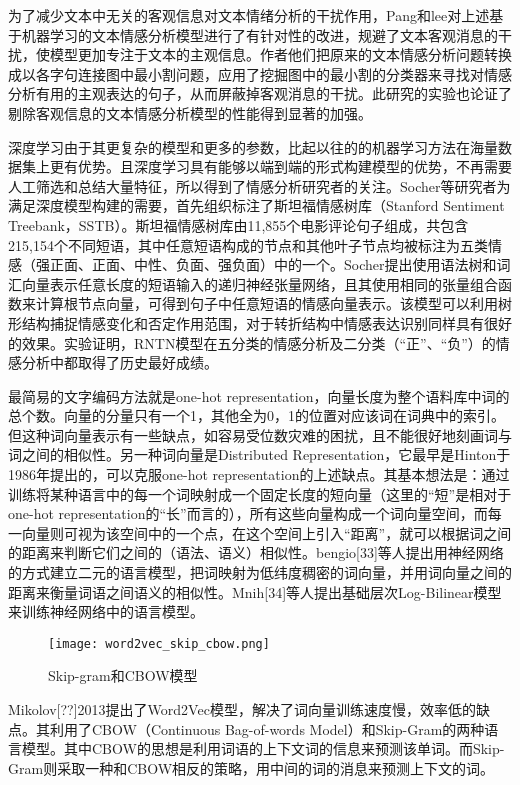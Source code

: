 为了减少文本中无关的客观信息对文本情绪分析的干扰作用，Pang和lee对上述基于机器学习的文本情感分析模型进行了有针对性的改进，规避了文本客观消息的干扰，使模型更加专注于文本的主观信息。作者他们把原来的文本情感分析问题转换成以各字句连接图中最小割问题，应用了挖掘图中的最小割的分类器来寻找对情感分析有用的主观表达的句子，从而屏蔽掉客观消息的干扰。此研究的实验也论证了剔除客观信息的文本情感分析模型的性能得到显著的加强。


深度学习由于其更复杂的模型和更多的参数，比起以往的的机器学习方法在海量数据集上更有优势。且深度学习具有能够以端到端的形式构建模型的优势，不再需要人工筛选和总结大量特征，所以得到了情感分析研究者的关注。Socher等研究者为满足深度模型构建的需要，首先组织标注了斯坦福情感树库（Stanford Sentiment Treebank，SSTB）。斯坦福情感树库由11,855个电影评论句子组成，共包含215,154个不同短语，其中任意短语构成的节点和其他叶子节点均被标注为五类情感（强正面、正面、中性、负面、强负面）中的一个。Socher提出使用语法树和词汇向量表示任意长度的短语输入的递归神经张量网络，且其使用相同的张量组合函数来计算根节点向量，可得到句子中任意短语的情感向量表示。该模型可以利用树形结构捕捉情感变化和否定作用范围，对于转折结构中情感表达识别同样具有很好的效果。实验证明，RNTN模型在五分类的情感分析及二分类（“正”、“负”）的情感分析中都取得了历史最好成绩。

最简易的文字编码方法就是one-hot representation，向量长度为整个语料库中词的总个数。向量的分量只有一个1，其他全为0，1的位置对应该词在词典中的索引。但这种词向量表示有一些缺点，如容易受位数灾难的困扰，且不能很好地刻画词与词之间的相似性。另一种词向量是Distributed Representation，它最早是Hinton于1986年提出的，可以克服one-hot representation的上述缺点。其基本想法是：通过训练将某种语言中的每一个词映射成一个固定长度的短向量（这里的“短”是相对于one-hot representation的“长”而言的），所有这些向量构成一个词向量空间，而每一向量则可视为该空间中的一个点，在这个空间上引入“距离”，就可以根据词之间的距离来判断它们之间的（语法、语义）相似性。bengio[33]等人提出用神经网络的方式建立二元的语言模型，把词映射为低纬度稠密的词向量，并用词向量之间的距离来衡量词语之间语义的相似性。Mnih[34]等人提出基础层次Log-Bilinear模型来训练神经网络中的语言模型。
\begin{figure}[htbp]
	\centering
	\texttt{[image: word2vec\_skip\_cbow.png]}
	\caption[rnn_vanish]{Skip-gram和CBOW模型}
\end{figure}
Mikolov[??]2013提出了Word2Vec模型，解决了词向量训练速度慢，效率低的缺点。其利用了CBOW（Continuous Bag-of-words Model）和Skip-Gram的两种语言模型。其中CBOW的思想是利用词语的上下文词的信息来预测该单词。而Skip-Gram则采取一种和CBOW相反的策略，用中间的词的消息来预测上下文的词。

